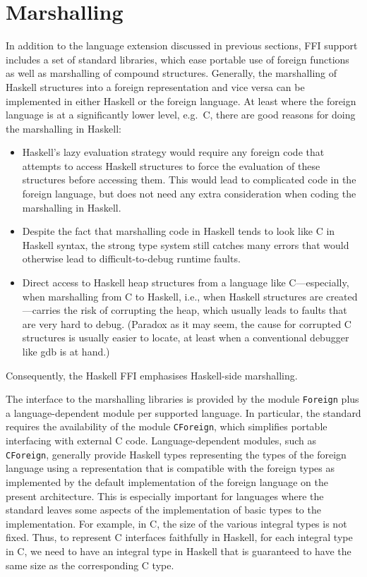 \documentclass[a4paper,twosides]{article}
\newcommand{\code}[1]{\texttt{#1}}      %
\begin{document}
\newpage
\section{Marshalling}
\label{sec:marshalling}

In addition to the language extension discussed in previous sections, FFI
support includes a set of standard libraries, which ease portable use of
foreign functions as well as marshalling of compound structures.  Generally,
the marshalling of Haskell structures into a foreign representation and vice
versa can be implemented in either Haskell or the foreign language.  At least
where the foreign language is at a significantly lower level, e.g.\ C, there
are good reasons for doing the marshalling in Haskell:
%
\begin{itemize}
\item Haskell's lazy evaluation strategy would require any foreign code that
  attempts to access Haskell structures to force the evaluation of these
  structures before accessing them. This would lead to complicated code in the
  foreign language, but does not need any extra consideration when coding the
  marshalling in Haskell.
\item Despite the fact that marshalling code in Haskell tends to look like C
  in Haskell syntax, the strong type system still catches many errors that
  would otherwise lead to difficult-to-debug runtime faults.
\item Direct access to Haskell heap structures from a language like
  C---especially, when marshalling from C to Haskell, i.e., when Haskell
  structures are created---carries the risk of corrupting the heap, which
  usually leads to faults that are very hard to debug. (Paradox as it may
  seem, the cause for corrupted C structures is usually easier to locate, at
  least when a conventional debugger like gdb is at hand.)
\end{itemize}
%
Consequently, the Haskell FFI emphasises Haskell-side marshalling.

The interface to the marshalling libraries is provided by the module
\code{Foreign} plus a language-dependent module per supported language.  In
particular, the standard requires the availability of the module
\code{CForeign}, which simplifies portable interfacing with external C code.
Language-dependent modules, such as \code{CForeign}, generally provide Haskell
types representing the types of the foreign language using a representation
that is compatible with the foreign types as implemented by the default
implementation of the foreign language on the present architecture.  This is
especially important for languages where the standard leaves some aspects of
the implementation of basic types to the implementation.  For example, in C,
the size of the various integral types is not fixed.  Thus, to represent C
interfaces faithfully in Haskell, for each integral type in C, we need to have
an integral type in Haskell that is guaranteed to have the same size as the
corresponding C type.
\end{document}
